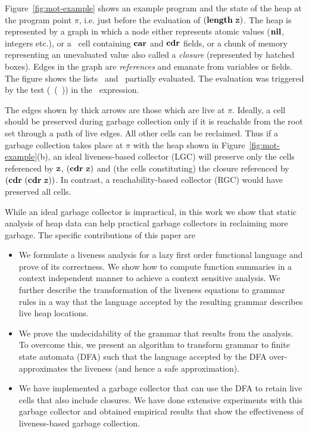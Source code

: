 \documentclass[9pt]{sigplanconf}
\begin{document}
Figure~\ref{fig:mot-example} shows an example program and the state of
the heap at  the program point $\pi$, i.e. just  before the evaluation
of $(\mathbf{length}\  \mbox{\tt z})$.  The heap is  represented by a graph  in which a
node either  represents atomic  values ($\mbox{$\mathbf{ nil}$}$,  integers etc.),  or a
\CONS\ cell containing $\mbox{$\mathbf{car}$}$ and $\mbox{$\mathbf{cdr}$}$  fields, or a chunk of memory
representing  an  unevaluated  value   also  called  a  {\em  closure}
(represented  by  hatched  boxes).   Edges   in  the  graph  are  {\em
  references} and emanate from variables  or fields.  The figure shows
the  lists \px\  and  \pz\ partially  evaluated.   The evaluation  was
triggered    by   the    test   (\NULLQ~(\CAR~\pz))    in   the
\SIF\ expression.


The edges  shown by thick  arrows are those  which are live  at $\pi$.
Ideally, a cell should be  preserved during garbage collection only if
it is reachable from  the root set through a path  of live edges.  All
other  cells can  be reclaimed.   Thus if  a garbage  collection takes
place at $\pi$ with the heap shown in Figure~\ref{fig:mot-example}(b),
an ideal liveness-based  collector (LGC) will preserve  only the cells
referenced by  $\mbox{\tt z}$, $(\mbox{$\mathbf{cdr}$}~ \mbox{\tt z})$  and (the cells  constituting) the
closure   referenced   by   $(\mbox{$\mathbf{cdr}$}~(\mbox{$\mathbf{cdr}$}~\mbox{\tt z}))$.    In   contrast,   a
reachability-based collector (RGC) would have preserved all cells.

While an ideal garbage collector is  impractical, in this work we show
that  static analysis  of  heap data  can help  practical garbage
collectors in reclaiming more  garbage.  The specific contributions of
this paper are
\begin{itemize}
\item  We  formulate  a  liveness  analysis for  a  lazy  first  order
  functional language  and prove  of its correctness.  We show  how to
  compute  function  summaries  in  a context  independent  manner  to
  achieve  a  context  sensitive  analysis. We  further  describe  the
  transformation of the  liveness equations to grammar rules  in a way
  that the language  accepted by the resulting  grammar describes live
  heap locations.
\item We prove  the undecidability of the grammar  that results from
  the  analysis.   To overcome  this,  we  present an  algorithm  to
  transform grammar  to finite  state automata  (DFA) such  that the
  language accepted by the  DFA over-approximates the liveness (and
  hence a safe approximation).
\item We have implemented a garbage  collector that can use the DFA
  to  retain live  cells that  also include  closures. We  have done
  extensive  experiments with  this garbage  collector and  obtained
  empirical results  that show  the effectiveness  of liveness-based
  garbage collection.
\end{itemize}
\end{document}
